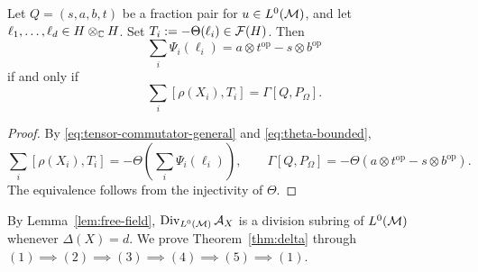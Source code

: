 \begin{lemma}\label{lem:tensor-certificate}
Let $Q=(s,a,b,t)$ be a fraction pair for $u\in L^0(\mathcal M)$, and let $\ell_1,\ldots,\ell_d\in H\otimes_{\mathbb C}H$.
Set $T_i:=-\Theta(\ell_i)\in\mathcal F(H)$.
Then
\[
 \sum_i\Psi_i(\ell_i)
 =a\otimes t^{\mathrm{op}}-s\otimes b^{\mathrm{op}}
\]
if and only if
\[
 \sum_i[\rho(X_i),T_i]=\Gamma[Q,P_\Omega].
\]
\end{lemma}
\begin{proof}
By \eqref{eq:tensor-commutator-general} and \eqref{eq:theta-bounded},
\[
 \sum_i[\rho(X_i),T_i]
 =-\Theta\left(\sum_i\Psi_i(\ell_i)\right),
 \qquad
 \Gamma[Q,P_\Omega]
 =-\Theta(a\otimes t^{\mathrm{op}}-s\otimes b^{\mathrm{op}}).
\]
The equivalence follows from the injectivity of $\Theta$.
\end{proof}

By Lemma~\ref{lem:free-field}, $\operatorname{Div}_{L^0(\mathcal M)}\mathcal A_X$ is a division subring of $L^0(\mathcal M)$ whenever $\Delta(X)=d$.
We prove Theorem~\ref{thm:delta} through $(1)\implies(2)\implies(3)\implies(4)\implies(5)\implies(1)$.

